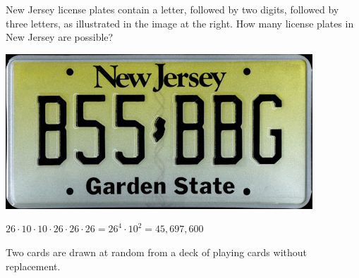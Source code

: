 \documentclass[addpoints,12pt]{exam}
\begin{document}
\begin{questions}

\begin{multicols}{2}
\question
New Jersey license plates contain a letter,
followed by two digits, followed by three letters,
as illustrated in the image at the right.
How many license plates in New Jersey are possible?\\
\columnbreak
\begin{center}\includegraphics[scale=.3]{NewJersy}
\end{center}
\end{multicols}
\begin{solution}
$26\cdot 10\cdot 10\cdot 26\cdot 26\cdot 26=26^4\cdot 10^2
=45,697,600$
\end{solution}
\newpage

\question Two cards are drawn at random from a deck of playing cards
without replacement.
\begin{solution}
\end{solution}
\vspace{1in}


\end{questions}
\end{document}
